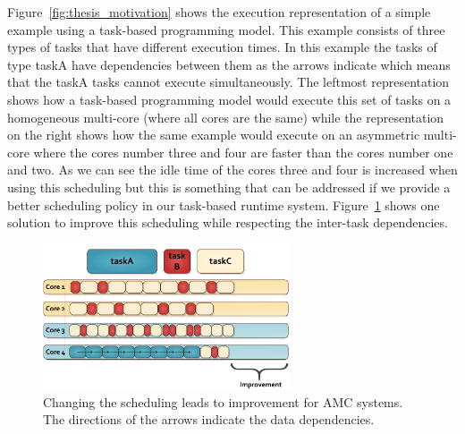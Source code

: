 Figure~\ref{fig:thesis_motivation} shows the execution representation of a simple example using a task-based programming model.
This example consists of three types of tasks that have different execution times.
In this example the tasks of type taskA have dependencies between them as the arrows indicate which means that the taskA tasks cannot execute simultaneously.
The leftmost representation shows how a task-based programming model would execute this set of tasks on a homogeneous multi-core (where all cores are the same) while the representation on the right shows how the same example would execute on an asymmetric multi-core where the cores number three and four are faster than the cores number one and two.
As we can see the idle time of the cores three and four is increased when using this scheduling but this is something that can be addressed if we provide a better scheduling policy in our task-based runtime system.
Figure~\ref{fig:thesis_motivation2} shows one solution to improve this scheduling while respecting the inter-task dependencies.
\begin{figure}[t]%
	\centering
	\includegraphics[width=0.65\textwidth]{figures/thesis_motivation2.pdf}
	\caption{Changing the scheduling leads to improvement for AMC systems. The directions of the arrows indicate the data dependencies.}
	\label{fig:thesis_motivation2}
\end{figure}

